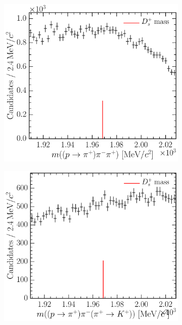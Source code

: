 \begin{figure}
\begin{subfigure}[b]{0.3\textwidth}
    \caption{\decay{\PDsplus}{\Ppiplus\PKminus\PKplus}}
    \label{fig:cpv:selection:background_study:ppipi_meson:dsplus_pikk}
  \end{subfigure}
  \begin{subfigure}[b]{0.3\textwidth}
    \includegraphics[width=\textwidth]{figures/cpv/selection/background_study/ppipi/LcToppipi_2012_MagDown_Ds_ppTopip_pim_pip}
    \caption{\decay{\PDsplus}{\Ppiplus\Ppiminus\Ppiplus}}
    \label{fig:cpv:selection:background_study:ppipi_meson:dsplus_pipipi}
  \end{subfigure}
  \begin{subfigure}[b]{0.3\textwidth}
    \includegraphics[width=\textwidth]{figures/cpv/selection/background_study/ppipi/LcToppipi_2012_MagDown_Ds_ppTopip_pim_pipTokp}

\end{subfigure}
\end{figure}
